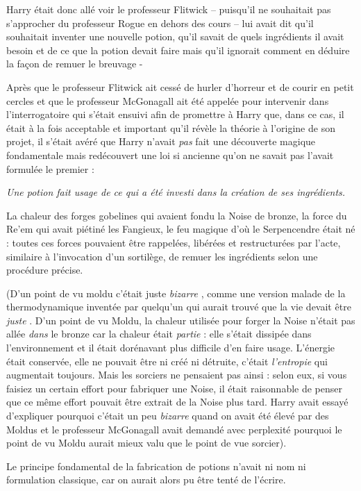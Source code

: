 Harry était donc allé voir le professeur Flitwick – puisqu'il ne souhaitait pas s'approcher du professeur Rogue en dehors des cours – lui avait dit qu'il souhaitait inventer une nouvelle potion, qu'il savait de quels ingrédients il avait besoin et de ce que la potion devait faire mais qu'il ignorait comment en déduire la façon de remuer le breuvage -

Après que le professeur Flitwick ait cessé de hurler d'horreur et de courir en petit cercles et que le professeur McGonagall ait été appelée pour intervenir dans l'interrogatoire qui s'était ensuivi afin de promettre à Harry que, dans ce cas, il était à la fois acceptable et important qu'il révèle la théorie à l'origine de son projet, il s'était avéré que Harry n'avait \emph{pas}  fait une découverte magique fondamentale mais redécouvert une loi si ancienne qu'on ne savait pas l'avait formulée le premier :

\emph{Une potion fait usage de ce qui a été investi dans la création de ses ingrédients.} 

La chaleur des forges gobelines qui avaient fondu la Noise de bronze, la force du Re'em qui avait piétiné les Fangieux, le feu magique d'où le Serpencendre était né : toutes ces forces pouvaient être rappelées, libérées et restructurées par l'acte, similaire à l'invocation d'un sortilège, de remuer les ingrédients selon une procédure précise.

(D'un point de vu moldu c'était juste \emph{bizarre} , comme une version malade de la thermodynamique inventée par quelqu'un qui aurait trouvé que la vie devait être \emph{juste} . D'un point de vu Moldu, la chaleur utilisée pour forger la Noise n'était pas allée \emph{dans } le bronze car la chaleur était \emph{partie}  : elle s'était dissipée dans l'environnement et il était dorénavant plus difficile d'en faire usage. L'énergie était conservée, elle ne pouvait être ni créé ni détruite, c'était \emph{l'entropie}  qui augmentait toujours. Mais les sorciers ne pensaient pas ainsi : selon eux, si vous faisiez un certain effort pour fabriquer une Noise, il était raisonnable de penser que ce même effort pouvait être extrait de la Noise plus tard. Harry avait essayé d'expliquer pourquoi c'était un peu \emph{bizarre}  quand on avait été élevé par des Moldus et le professeur McGonagall avait demandé avec perplexité pourquoi le point de vu Moldu aurait mieux valu que le point de vue sorcier).

Le principe fondamental de la fabrication de potions n'avait ni nom ni formulation classique, car on aurait alors pu être tenté de l'écrire.

